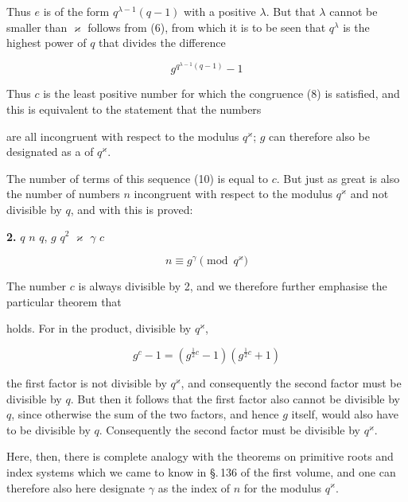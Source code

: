 
Thus $e$ is of the form $q^{\lambda-1}(q-1)$ with a positive $\lambda$. But that $\lambda$ cannot be smaller than $\varkappa$ follows from (6), from which it is to be seen that $q^\lambda$ is the highest power of $q$ that divides the difference

\[
g^{q^{\lambda-1}(q-1)} - 1
\]

Thus $c$ is the least positive number for which the congruence (8) is satisfied, and this is equivalent to the statement that the numbers


are all incongruent with respect to the modulus $q^\varkappa$; $g$ can therefore also be designated as a  of $q^\varkappa$.

The number of terms of this sequence (10) is equal to $c$. But just as great is also the number of numbers $n$ incongruent with respect to the modulus $q^\varkappa$ and not divisible by $q$, and with this is proved:

\noindent\textbf{2.}  $q$  $n$  $q$, $g$  $q^2$  $\varkappa$  $\gamma$  $c$ 

\[
n \equiv g^\gamma \pmod{q^\varkappa}
\]


The number $c$ is always divisible by 2, and we therefore further emphasise the particular theorem that


holds. For in the product, divisible by $q^\varkappa$,

\[
g^c - 1 = (g^{\frac12 c} - 1)(g^{\frac12 c} + 1)
\]

the first factor is not divisible by $q^\varkappa$, and consequently the second factor must be divisible by $q$. But then it follows that the first factor also cannot be divisible by $q$, since otherwise the sum of the two factors, and hence $g$ itself, would also have to be divisible by $q$. Consequently the second factor must be divisible by $q^\varkappa$.

Here, then, there is complete analogy with the theorems on primitive roots and index systems which we came to know in \S.\,136 of the first volume, and one can therefore also here designate $\gamma$ as the index of $n$ for the modulus $q^\varkappa$.

